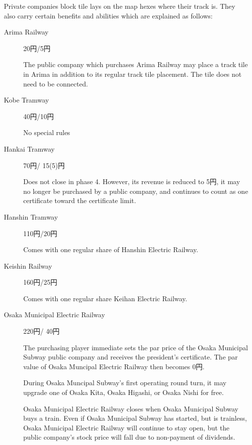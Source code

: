 \begin{multicols}{2}
\label{privates}
Private companies block tile lays on the map hexes where their track
is. They also carry certain benefits and abilities which are explained
as follows:

\begin{description}
\item[Arima Railway] \hfill 20円/5円

  The public company which purchases Arima Railway may place a track
  tile in Arima in addition to its regular track tile placement. The
  tile does not need to be connected.

\item[Kobe Tramway] \hfill 40円/10円

  No special rules

\item[Hankai Tramway] \hfill 70円/ 15(5)円

  Does not close in phase 4. However, its revenue is reduced to 5円, it may
  no longer be purchased by a public company, and continues to count
  as one certificate toward the certificate limit.

\item[Hanshin Tramway] \hfill 110円/20円

Comes with one regular share of Hanshin Electric Railway.

\item[Keishin Railway] \hfill 160円/25円

Comes with one regular share Keihan Electric Railway.

\item[Osaka Municipal Electric Railway] \hfill 220円/ 40円 \label{osaka-municipal}

  The purchasing player immediate sets the par price of the Osaka
  Municipal Subway public company and receives the president's
  certificate. The par value of Osaka Muncipal Electric Railway then
  becomes 0円.

  During Osaka Muncipal Subway's first operating round turn, it may
  upgrade one of Osaka Kita, Osaka Higashi, or Osaka Nishi for free.

  Osaka Municipal Electric Railway closes when Osaka Municipal Subway
  buys a train. Even if Osaka Municipal Subway has started, but is
  trainless, Osaka Municipal Electric Railway will continue to stay
  open, but the public company's stock price will fall due to
  non-payment of dividends.
\end{description}


\end{multicols}

